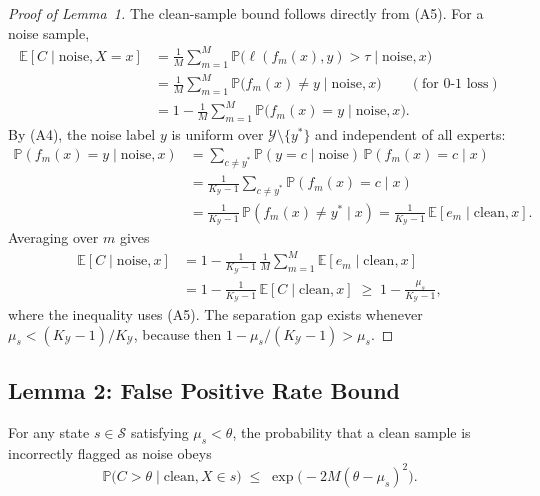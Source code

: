\begin{proof}[Proof of Lemma~1]
The clean-sample bound follows directly from (A5). For a noise sample,
\begin{align*}
\mathbb{E}[C \mid \text{noise}, X = x]
&= \frac{1}{M}\sum_{m=1}^M \mathbb{P}\bigl(\ell(f_m(x), y) > \tau
   \;\big|\; \text{noise}, x\bigr) \\
&= \frac{1}{M}\sum_{m=1}^M \mathbb{P}\bigl(f_m(x) \neq y
   \;\big|\; \text{noise}, x\bigr) \qquad(\text{for } 0\text{-}1\text{ loss}) \\
&= 1 - \frac{1}{M}\sum_{m=1}^M \mathbb{P}\bigl(f_m(x) = y
   \;\big|\; \text{noise}, x\bigr).
\end{align*}
By (A4), the noise label $y$ is uniform over $\mathcal{Y}\setminus\{y^*\}$ and
independent of all experts:
\begin{align*}
\mathbb{P}(f_m(x) = y \mid \text{noise}, x)
&= \sum_{c \neq y^*} \mathbb{P}(y = c \mid \text{noise})\,
   \mathbb{P}(f_m(x) = c \mid x) \\
&= \frac{1}{K_{\mathcal{Y}}-1} \sum_{c \neq y^*}
   \mathbb{P}(f_m(x) = c \mid x) \\
&= \frac{1}{K_{\mathcal{Y}}-1}\,
   \mathbb{P}(f_m(x) \neq y^* \mid x)
 = \frac{1}{K_{\mathcal{Y}}-1}\,
   \mathbb{E}[e_m \mid \text{clean}, x].
\end{align*}
Averaging over $m$ gives
\begin{align*}
\mathbb{E}[C \mid \text{noise}, x]
&= 1 - \frac{1}{K_{\mathcal{Y}}-1}\,
   \frac{1}{M}\sum_{m=1}^M \mathbb{E}[e_m \mid \text{clean}, x] \\
&= 1 - \frac{1}{K_{\mathcal{Y}}-1}\,
   \mathbb{E}[C \mid \text{clean}, x]
\;\geq\; 1 - \frac{\mu_s}{K_{\mathcal{Y}}-1},
\end{align*}
where the inequality uses (A5). The separation gap exists whenever
$\mu_s < (K_{\mathcal{Y}}-1)/K_{\mathcal{Y}}$, because then
$1 - \mu_s/(K_{\mathcal{Y}}-1) > \mu_s$. \end{proof}

\subsection{Lemma 2: False Positive Rate Bound}
\label{sec:thm1:lemma2}

\begin{lemma}
\label{lem:fpr-bound}
For any state $s \in \mathcal{S}$ satisfying $\mu_s < \theta$, the probability
that a clean sample is incorrectly flagged as noise obeys
\begin{equation}
\mathbb{P}\bigl(C > \theta \mid \text{clean}, X \in s\bigr)
\;\leq\; \exp\!\bigl(-2M(\theta - \mu_s)^2\bigr).
\label{eq:fpr-bound}
\end{equation}
\end{lemma}

